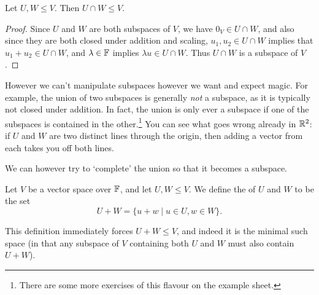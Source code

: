 \documentclass[a4paper]{scrartcl}
\begin{document}
\begin{proposition}
    Let $U, W \leq V$. Then $U \cap W \leq V$.
\end{proposition}
\begin{proof}
    Since $U$ and $W$ are both subspaces of $V$, we have $0_V \in U \cap W$, and also since they are both closed under addition and scaling, $u_1, u_2 \in U \cap W$ implies that $u_1 + u_2 \in U \cap W$, and $\lambda \in \mathbb{F}$ implies $\lambda u \in U\cap W$. Thus $U \cap W$ is a subspace of $V$. 
\end{proof}

However we can't manipulate subspaces however we want and expect magic. For example, the union of two subspaces is generally \emph{not} a subspace, as it is typically not closed under addition. In fact, the union is only ever a subspace if one of the subspaces is contained in the other.\footnote{There are some more exercises of this flavour on the example sheet.}
You can see what goes wrong already in $\mathbb{R}^2$: if $U$ and $W$ are two distinct lines through the origin, then adding a vector from each takes you off both lines.
\begin{center}
\end{center}
We can however try to `complete' the union so that it becomes a subspace.

\begin{definition}
    Let $V$ be a vector space over $\mathbb{F}$, and let $U, W \leq V$. We define the  of $U$ and $W$ to be the set
    $$
    U + W = \{u + w \mid u \in U, w \in W \}.
    $$
\end{definition}

This definition immediately forces $U + W \leq V$, and indeed it is the minimal such space (in that any subspace of $V$ containing both $U$ and $W$ must also contain $U + W$).
\end{document}
